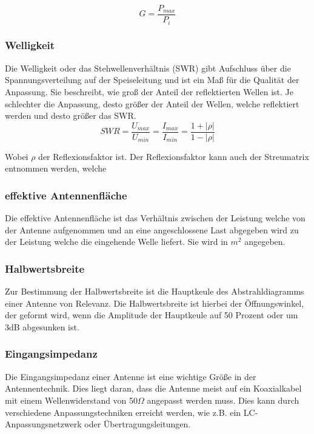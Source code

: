 \begin{equation}
	G=\frac{P_{max}}{P_{i}}
\end{equation}

\subsubsection{Welligkeit}
Die Welligkeit oder das Stehwellenverhältnis (SWR) gibt Aufschluss über die Spannungsverteilung auf der Speiseleitung und ist ein Maß für die Qualität der Anpassung. Sie beschreibt, wie groß der Anteil der reflektierten Wellen ist. Je schlechter die Anpassung, desto größer der Anteil der Wellen, welche reflektiert werden und desto größer das SWR.\\

\begin{equation}
	SWR=\frac{U_{max}}{U_{min}}=\frac{I_{max}}{I_{min}}=\frac{1+\lvert \rho \lvert}{1-\lvert \rho \lvert}
\end{equation}

Wobei $\rho$ der Reflexionsfaktor ist. Der Reflexionsfaktor kann auch der Streumatrix entnommen werden, welche


\subsubsection{effektive Antennenfläche}
Die effektive Antennenfläche ist das Verhältnis zwischen der Leistung welche von der Antenne aufgenommen und an eine angeschlossene Last abgegeben wird zu der Leistung welche die eingehende Welle liefert. Sie wird in $m^2$ angegeben.

\subsubsection{Halbwertsbreite}
Zur Bestimmung der Halbwertsbreite ist die Hauptkeule des Abstrahldiagramms einer Antenne von Relevanz. Die Halbwertsbreite ist hierbei der Öffnungswinkel, der geformt wird, wenn die Amplitude der Hauptkeule auf 50 Prozent oder um 3dB abgesunken ist.

\subsubsection{Eingangsimpedanz}
Die Eingangsimpedanz einer Antenne ist eine wichtige Größe in der Antennentechnik. Dies liegt daran, dass die Antenne meist auf ein Koaxialkabel mit einem Wellenwiderstand von 50$\Omega$ angepasst werden muss. Dies kann durch verschiedene Anpassungstechniken erreicht werden, wie z.B. ein LC-Anpassungsnetzwerk oder Übertragungsleitungen. 

